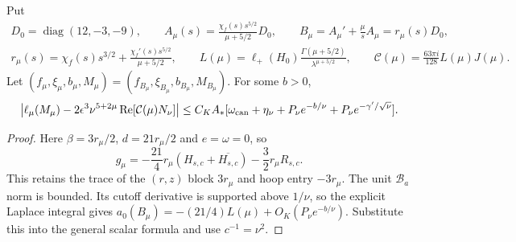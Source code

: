 \begin{corollary}\label{flat-return:coefficient}
Put
\[
\begin{gathered}
 D_0=\operatorname{diag}(12,-3,-9),\qquad
 A_\mu(s)=\frac{\chi_f(s)s^{5/2}}{\mu+5/2}D_0,\qquad
 B_\mu=A_\mu'+\frac\mu s A_\mu=r_\mu(s)D_0,\\
 r_\mu(s)=\chi_f(s)s^{3/2}
      +\frac{\chi_f'(s)s^{5/2}}{\mu+5/2},\qquad
 L(\mu)=\ell_+(H_0)\frac{\Gamma(\mu+5/2)}{\lambda^{\mu+5/2}},
 \qquad \mathcal C(\mu)=\frac{63\pi i}{128}L(\mu)J(\mu).
\end{gathered}
\]
Let $(f_\mu,\xi_\mu,b_\mu,M_\mu)=(f_{B_\mu},\xi_{B_\mu},b_{B_\mu},M_{B_\mu})$.
For some $b>0$,
\[
 \left|\ell_\mu(M_\mu)-2\epsilon^3\nu^{5+2\mu}
                 \operatorname{Re}[\mathcal C(\mu)N_\nu]\right|
 \le C_KA_*[\omega_{\rm can}+\eta_\nu+
               P_\nu e^{-b/\nu}+P_\nu e^{-\gamma'/\sqrt\nu}].
\]
\end{corollary}
\begin{proof}
Here $\beta=3r_\mu/2$, $d=21r_\mu/2$ and $e=\omega=0$, so
\begin{equation}\label{flat-return:source}
 g_\mu=-\frac{21}{4}r_\mu(H_{s,c}+\overline{H_{s,c}})
              -\frac32r_\mu R_{s,c}.
\end{equation}
This retains the trace of the $(r,z)$ block $3r_\mu$ and hoop entry $-3r_\mu$.
The unit $\mathscr B_a$ norm is bounded. Its cutoff derivative is
supported above $1/\nu$, so the explicit Laplace integral gives
$a_0(B_\mu)=-(21/4)L(\mu)+O_K(P_\nu e^{-b/\nu})$.
Substitute this into the general scalar formula and use $c^{-1}=\nu^2$.
\end{proof}
